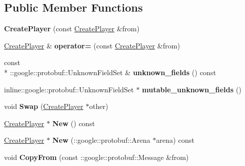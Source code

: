 \subsection*{Public Member Functions}
\begin{DoxyCompactItemize}
\item 
\hypertarget{class_create_player_a5467ecbd35d70d79efdb29585750ebdd}{{\bfseries Create\-Player} (const \hyperlink{class_create_player}{Create\-Player} \&from)}\label{class_create_player_a5467ecbd35d70d79efdb29585750ebdd}

\item 
\hypertarget{class_create_player_a6d76729d94045fa53266443aa470a0fa}{\hyperlink{class_create_player}{Create\-Player} \& {\bfseries operator=} (const \hyperlink{class_create_player}{Create\-Player} \&from)}\label{class_create_player_a6d76729d94045fa53266443aa470a0fa}

\item 
\hypertarget{class_create_player_ae9037e8587010e7098b08f04baddf82a}{const \\*
\-::google\-::protobuf\-::\-Unknown\-Field\-Set \& {\bfseries unknown\-\_\-fields} () const }\label{class_create_player_ae9037e8587010e7098b08f04baddf82a}

\item 
\hypertarget{class_create_player_ae68cce2fe165a57865c55ea1df283b1c}{inline\-::google\-::protobuf\-::\-Unknown\-Field\-Set $\ast$ {\bfseries mutable\-\_\-unknown\-\_\-fields} ()}\label{class_create_player_ae68cce2fe165a57865c55ea1df283b1c}

\item 
\hypertarget{class_create_player_a4e03e69e9f10d6a793e116e8234959cf}{void {\bfseries Swap} (\hyperlink{class_create_player}{Create\-Player} $\ast$other)}\label{class_create_player_a4e03e69e9f10d6a793e116e8234959cf}

\item 
\hypertarget{class_create_player_ac32d4379f1fb60282feb65513c673739}{\hyperlink{class_create_player}{Create\-Player} $\ast$ {\bfseries New} () const }\label{class_create_player_ac32d4379f1fb60282feb65513c673739}

\item 
\hypertarget{class_create_player_acce271bc0b594deb9186de689a991b5b}{\hyperlink{class_create_player}{Create\-Player} $\ast$ {\bfseries New} (\-::google\-::protobuf\-::\-Arena $\ast$arena) const }\label{class_create_player_acce271bc0b594deb9186de689a991b5b}

\item 
\hypertarget{class_create_player_afa1a1c65463f21a36c60c624a2830f8b}{void {\bfseries Copy\-From} (const \-::google\-::protobuf\-::\-Message \&from)}\label{class_create_player_afa1a1c65463f21a36c60c624a2830f8b}


\end{DoxyCompactItemize}
